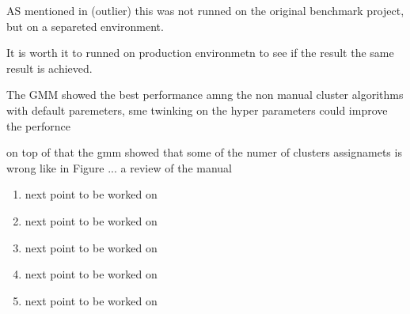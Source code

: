 AS mentioned  in (outlier) this was not runned on the original benchmark project, but on a separeted environment. 

It is worth it to runned on production environmetn to see if the result the same result is achieved.

The GMM showed the best performance amng the non manual cluster algorithms with default paremeters, sme twinking on the hyper parameters could improve the perfornce

 on top of that the gmm showed that some of the numer of clusters assignamets is wrong like in Figure ... a review of the manual 
 
\begin{enumerate}
  \item next point to be worked on 
  \item next point to be worked on 
  \item next point to be worked on 
  \item next point to be worked on 
  \item next point to be worked on 
\end{enumerate}
